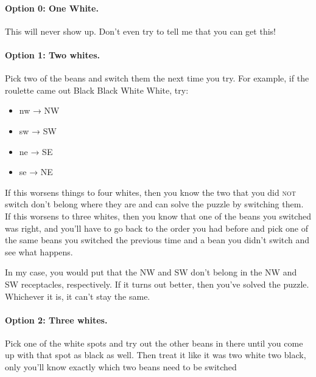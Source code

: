 \documentclass[10pt,twoside,openright]{report}
\providecommand{\tightlist}{%
  \setlength{\itemsep}{0pt}\setlength{\parskip}{0pt}}
\let\oldparagraph\paragraph
\renewcommand{\paragraph}[1]{\oldparagraph{#1}\mbox{}\nopagebreak}
\newcommand\textlcsc[1]{\texorpdfstring{\textsc{\MakeLowercase{#1}}}{#1}}
\begin{document}
\paragraph{Option 0: One White.} This will never show up. Don't even try to
tell me that you can get this!

\paragraph{Option 1: Two whites.} Pick two of the beans and switch them the
next time you try. For example, if the roulette came out Black Black White
White, try:%
%
\begin{itemize}
\tightlist
\item
  nw → NW
\item
  sw → SW
\item
  ne → SE
\item
  se → NE
\end{itemize}

If this worsens things to four whites, then you know the two that you did
\textlcsc{NOT} switch don't belong where they are and can solve the puzzle by
switching them. If this worsens to three whites, then you know that one of
the beans you switched was right, and you'll have to go back to the order you
had before and pick one of the same beans you switched the previous time and
a bean you didn't switch and see what happens.

In my case, you would put that the NW and SW don't belong in the NW and SW
receptacles, respectively. If it turns out better, then you've solved the
puzzle. Whichever it is, it can't stay the same.

\paragraph{Option 2: Three whites.} Pick one of the white spots and try out
the other beans in there until you come up with that spot as black as
well. Then treat it like it was two white two black, only you'll know exactly
which two beans need to be switched
\end{document}
